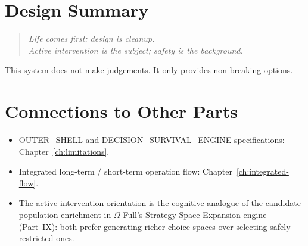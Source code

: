 \section{Design Summary}
\label{sec:life-sop-design-summary}

\begin{quote}
\itshape
Life comes first; design is cleanup.\\
Active intervention is the subject; safety is the background.
\end{quote}

\noindent
This system does not make judgements. It only provides non-breaking
options.

\section*{Connections to Other Parts}

\begin{itemize}
\item OUTER\_SHELL and DECISION\_SURVIVAL\_ENGINE specifications:
Chapter~\ref{ch:limitations}.
\item Integrated long-term / short-term operation flow:
Chapter~\ref{ch:integrated-flow}.
\item The active-intervention orientation is the cognitive analogue
of the candidate-population enrichment in $\Omega$ Full's
Strategy Space Expansion engine (Part~IX): both prefer
generating richer choice spaces over selecting safely-restricted
ones.
\end{itemize}
